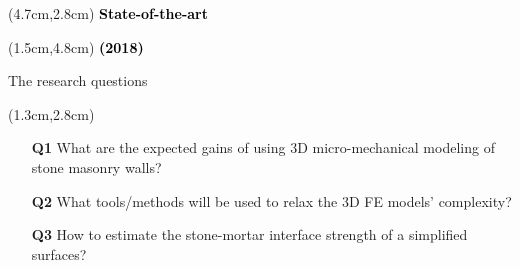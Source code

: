 \documentclass{EESD}
\begin{document}
\begin{frame}[t]{}
\begin{textblock*}{10cm}(4.7cm,2.8cm)
\Huge\textbf{\textcolor{black}{State-of-the-art}}
\end{textblock*}
\begin{textblock*}{10cm}(1.5cm,4.8cm)
\small\textbf{\textcolor{black}{{\cite{REF:5} (2018)}
}}
\end{textblock*}
\end{frame}
\usebackgroundtemplate{}

\begin{frame}[t]{The research questions}\vspace{10pt}
    \begin{textblock*}{13cm}(1.3cm,2.8cm)
        \begin{itemize}
            \item[\textbf{Q1}] What are the expected gains of using 3D micro-mechanical modeling of stone masonry walls?\vspace{10pt}\pause
            \item[\textbf{Q2}] What tools/methods will be used to relax the 3D FE models' complexity?\vspace{20pt}\pause
            \item[\textbf{Q3}] How to estimate the stone-mortar interface strength of a simplified surfaces?
        \end{itemize}
    \end{textblock*}
\end{frame}
\end{document}
